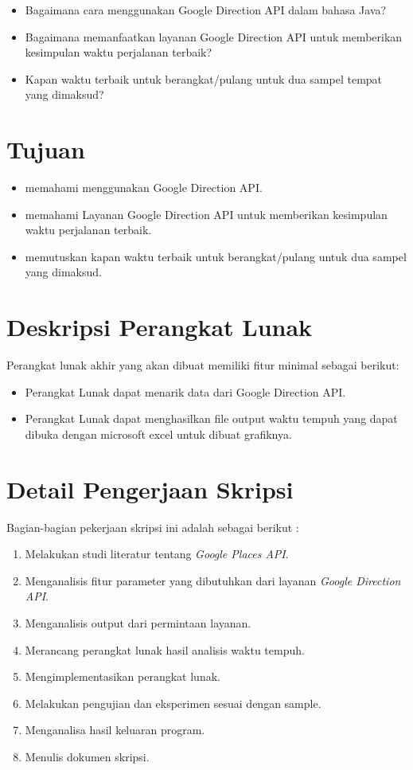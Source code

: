\documentclass[a4paper,twoside]{article}
\begin{document}
\begin{itemize}
	\item Bagaimana cara menggunakan Google Direction API dalam bahasa Java?
	\item Bagaimana memanfaatkan layanan Google Direction API untuk memberikan kesimpulan waktu perjalanan terbaik?
	\item Kapan waktu terbaik untuk berangkat/pulang untuk dua sampel tempat yang dimaksud?
\end{itemize}

\section{Tujuan}

\begin{itemize}
	\item memahami menggunakan Google Direction API.
	\item memahami Layanan Google Direction API untuk memberikan kesimpulan waktu perjalanan terbaik.
	\item memutuskan kapan waktu terbaik untuk berangkat/pulang untuk dua sampel yang dimaksud.
\end{itemize}

\section{Deskripsi Perangkat Lunak}

Perangkat lunak akhir yang akan dibuat memiliki fitur minimal sebagai berikut:
\begin{itemize}
	\item Perangkat Lunak dapat menarik data dari Google Direction API.
	\item Perangkat Lunak dapat menghasilkan file output waktu tempuh yang dapat dibuka dengan microsoft excel untuk dibuat grafiknya.
\end{itemize}

\section{Detail Pengerjaan Skripsi}

Bagian-bagian pekerjaan skripsi ini adalah sebagai berikut :
	\begin{enumerate}
		\item Melakukan studi literatur tentang \textit{Google Places API}.
		\item Menganalisis fitur parameter yang dibutuhkan dari layanan \textit{Google Direction API}.
		\item Menganalisis output dari permintaan layanan.
		\item Merancang perangkat lunak hasil analisis waktu tempuh.
		\item Mengimplementasikan perangkat lunak.
		\item Melakukan pengujian dan eksperimen sesuai dengan sample.
		\item Menganalisa hasil keluaran program.
		\item Menulis dokumen skripsi.
	\end{enumerate}
\end{document}
